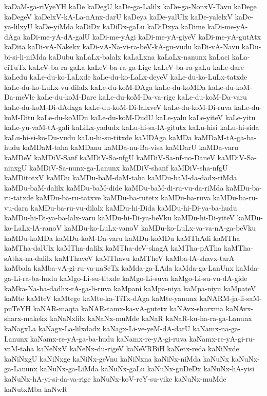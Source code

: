 {kaDaM-ga-riVyeYH
kaDe
kaDegU
kaDe-ga-Lalilx
kaDe-ga-NonxV-Tavu
kaDege
kaDegeV
kaDelxV-kA-La-nAnx-darU
kaDeya
kaDe-yalUlx
kaDe-yalelxV
kaDe-ya-lilxyU
kaDe-yiMda
kaDiDx
kaDiDx-gaLu
kaDiDxya
kaDime
kaDi-me-yA-dAga
kaDi-me-yA-dA-galU
kaDi-me-yAgi
kaDi-me-yA-giyeV
kaDi-me-yA-gutAtx
kaDita
kaDi-vA-Nakekx
kaDi-vA-Na-vi-ra-beV-kA-gu-vudu
kaDi-vA-Navu
kaDu-bi-si-li-niMda
kaDubu
kaLaLx-balalx
kaLaLxna
kaLaLx-nanunx
kaLaci
kaLa-ciTuTx
kaLeV-ba-ra-gaLa
kaLeV-ba-ra-ga-Lige
kaLeV-ba-ra-gaLu
kaLe-dare
kaLedu
kaLe-du-ko-LaLxde
kaLe-du-ko-LaLx-deyeV
kaLe-du-ko-LuLx-tatxde
kaLe-du-ko-LuLx-vu-dilalx
kaLe-du-koM-DAga
kaLe-du-koMDa
kaLe-du-koM-Da-meVle
kaLe-du-koM-Dare
kaLe-du-koM-Da-va-rige
kaLe-du-koM-Da-varu
kaLe-du-koM-Di-dAdxga
kaLe-du-koM-Di-lalxveV
kaLe-du-koM-Di-ruva
kaLe-du-koM-Ditu
kaLe-du-koMDu
kaLe-du-koM-DudU
kaLe-yalu
kaLe-yiteV
kaLe-yitu
kaLe-yu-vaM-tA-gali
kaLiLx-yadudx
kaLu-hi-sa-lA-gitutx
kaLu-hisi
kaLu-hi-sida
kaLu-hi-si-ko-Du-vudu
kaLu-hi-su-titxde
kaMDAga
kaMDa
kaMDaM-tA-ga-ba-hudu
kaMDaM-taha
kaMDanu
kaMDa-nu-Ba-visa
kaMDarU
kaMDa-varu
kaMDeV
kaMDiV-Sanf
kaMDiV-Sa-nfgU
kaMDiV-Sa-nf-no-DaneV
kaMDiV-Sa-ninxgU
kaMDiV-Sa-nunx-ga-Lanunx
kaMDiV-shanf
kaMDiV-sha-nfgU
kaMDitotxV
kaMDu
kaMDu-baM-daM-taha
kaMDu-baM-da-dadx-riMda
kaMDu-baM-dalilx
kaMDu-baM-dide
kaMDu-baM-di-ru-vu-da-riMda
kaMDu-ba-ru-tatxde
kaMDu-ba-ru-tatxve
kaMDu-ba-rutetx
kaMDu-ba-ruva
kaMDu-ba-ru-vu-dara
kaMDu-ba-ru-vu-dilalx
kaMDu-hi-Dida
kaMDu-hi-Di-ya-ba-hudu
kaMDu-hi-Di-ya-ba-lalx-varu
kaMDu-hi-Di-ya-beVku
kaMDu-hi-Di-yiteV
kaMDu-ko-LaLx-lA-ranoV
kaMDu-ko-LuLx-vanoV
kaMDu-ko-LuLx-va-va-nA-ga-beVku
kaMDu-koMDa
kaMDu-koM-Da-varu
kaMDu-koMDu
kaMThAdi
kaMTha
kaMTha-dalUlx
kaMTha-dalilx
kaMTha-deV-shagA
kaMTha-pATha
kaMTha-sAthx-na-dalilx
kaMThaveV
kaMThavu
kaMTheV
kaMba-lA-shavx-tarA
kaMbala
kaMba-vA-gi-ru-va-naSeTx
kaMda-ga-LAda
kaMda-ga-LanUnx
kaMda-ga-Li-ra-ba-hudu
kaMgo-Li-su-titxde
kaMgo-Li-suva
kaMgo-Li-su-vu-dA-gide
kaMka-Na-ba-dadhx-rA-ga-li-ruva
kaMpani
kaMpa-niya
kaMpa-niyu
kaMpateV
kaMte
kaMteV
kaMtege
kaMte-ka-TiTx-dAga
kaMte-yanunx
kaNARM-ja-li-saM-puTeYH
kaNAR-maqta
kaNAR-tamx-ka-vA-gutetx
kaNAvx-sharxma
kaNAvx-sharx-makekx
kaNaNxlilx
kaNaNx-muMde
kaNaR
kaNaR-ku-ha-ra-ga-Lanunx
kaNagxLa
kaNagx-La-lilxdadx
kaNagx-Li-ve-yeM-dA-darU
kaNamx-na-ga-Lanunx
kaNamx-re-yA-ga-ba-hudu
kaNamx-re-yA-gi-ruva
kaNamx-re-yA-gi-ru-vaM-taha
kaNeNxV
kaNeNx-du-rigeV
kaNeVRBiH
kaNetx-reda
kaNiNxde
kaNiNxgU
kaNiNxge
kaNiNx-geVnu
kaNiNxna
kaNiNx-niMda
kaNuNx
kaNuNx-ga-Lanunx
kaNuNx-ga-LiMda
kaNuNx-gaLu
kaNuNx-guDeDx
kaNuNx-hA-yisi
kaNuNx-hA-yi-si-da-va-rige
kaNuNx-koV-reY-su-vike
kaNuNx-muMde
kaNutxMba
kaNwR
}

